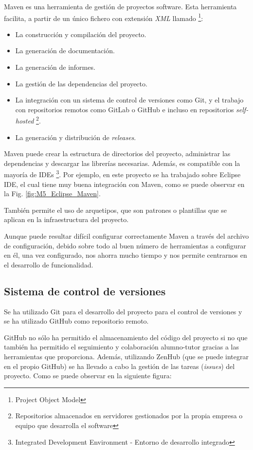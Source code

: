Maven es una herramienta de gestión de proyectos software. Esta herramienta facilita, a partir de un único fichero con extensión \textit{XML} llamado  \footnote{Project Object Model}:
\begin{itemize}
	\tightlist
	\item La construcción y compilación del proyecto.
	\item La generación de documentación.
	\item La generación de informes.
	\item La gestión de las dependencias del proyecto.
	\item La integración con un sistema de control de versiones como Git, y el trabajo con repositorios remotos como GitLab o GitHub e incluso en repositorios \textit{self-hosted} \footnote{Repositorios almacenados en servidores gestionados por la propia empresa o equipo que desarrolla el software}.
	\item La generación y distribución de \textit{releases}.
\end{itemize}
Maven puede crear la estructura de directorios del proyecto, administrar las dependencias y descargar las librerías necesarias. Además, es compatible con la mayoría de IDEs \footnote{Integrated Development Environment - Entorno de desarrollo integrado}. Por ejemplo, en este proyecto se ha trabajado sobre Eclipse IDE, el cual tiene muy buena integración con Maven, como se puede observar en la Fig. \ref{fig:M5_Eclipse_Maven}.


También permite el uso de arquetipos, que son patrones o plantillas que se aplican en la infraestructura del proyecto.

Aunque puede resultar difícil configurar correctamente Maven a través del archivo de configuración, debido sobre todo al buen número de herramientas a configurar en él, una vez configurado, nos ahorra mucho tiempo y nos permite centrarnos en el desarrollo de funcionalidad.

\subsection{Sistema de control de versiones}

Se ha utilizado Git para el desarrollo del proyecto para el control de versiones y se ha utilizado GitHub como repositorio remoto. 

GitHub no sólo ha permitido el almacenamiento del código del proyecto si no que también ha permitido el seguimiento y colaboración alumno-tutor gracias a las herramientas que proporciona. Además, utilizando ZenHub (que se puede integrar en el propio GitHub) se ha llevado a cabo la gestión de las tareas (\textit{issues}) del proyecto. Como se puede observar en la siguiente figura:

